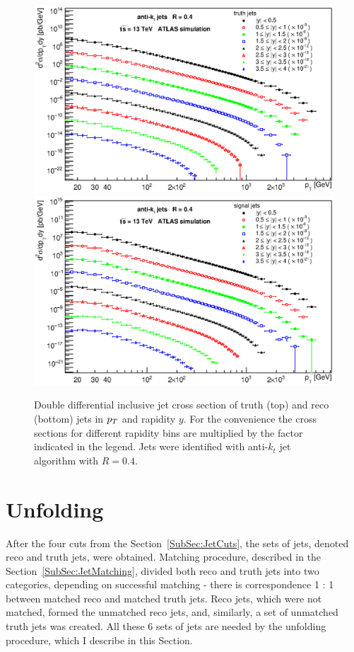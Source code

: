 \begin{figure}[p]
  \centering
  \includegraphics[width=\textwidth]{Chapter3/ptTruthAllRapidityBins.eps}
  \includegraphics[width=\textwidth]{Chapter3/ptSignalAllRapidityBins.eps}
  \caption{Double differential inclusive jet cross section of truth (top) and
    reco (bottom) jets in $p_{T}$ and rapidity $y$.  For the convenience the cross
    sections for different rapidity bins are multiplied by the factor indicated
    in the legend. Jets were identified with anti-$k_t$ jet algorithm with
    $R=0.4$.}
  \label{fig:ptSpectraMasacreEverythingFuck}
\end{figure}

\section{Unfolding}
\label{Sec:Unfolding3}

After the four cuts from the Section~\ref{SubSec:JetCuts}, the sets of jets,
denoted reco and truth jets, were obtained. Matching procedure, described in the
Section~\ref{SubSec:JetMatching},
divided both reco and truth jets into two categories, depending on successful
matching - there is correspondence 1 : 1 between matched reco and matched truth
jets. Reco jets, which were not matched, formed the unmatched reco jets, and,
similarly, a set of unmatched truth jets was created. All these 6 sets of jets
are needed by the unfolding procedure, which I describe in this Section.

